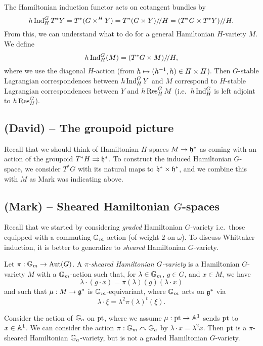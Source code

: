 \documentclass{article}
\begin{document}
The Hamiltonian induction functor acts on cotangent bundles by
\[
	h\Ind_H^G T^*Y = T^*(G \times^H Y) = T^*(G \times Y) \sslash H = (T^*G \times T^*Y) \sslash H.
\]
From this, we can understand what to do for a general Hamiltonian $H$-variety $M$.
We define
\[
	h\Ind_H^G(M) = (T^*G \times M) \sslash H,
\]
where we use the diagonal $H$-action (from $h \mapsto (h\inv, h) \in H \times H$).
Then $G$-stable Lagrangian correspondences between $h\Ind_H^G Y$ and $M$ correspond to $H$-stable Lagrangian correspondences between $Y$ and $h\Res_H^G M$ (i.e.\ $h\Ind_H^G$ is left adjoint to $h\Res_H^G$).

\subsection{(David) -- The groupoid picture}

Recall that we should think of Hamiltonian $H$-spaces $M \to \hf^*$ as coming with an action of the groupoid $T^*H \rightrightarrows \hf^*$.
To construct the induced Hamiltonian $G$-space, we consider $T^*G$ with its natural maps to $\hf^* \times \hf^*$, and we combine this with $M$ as Mark was indicating above.

\subsection{(Mark) -- Sheared Hamiltonian $G$-spaces}

Recall that we started by considering \emph{graded} Hamiltonian $G$-variety i.e.\ those equipped with a commuting $\GG_m$-action (of weight $2$ on $\omega$).
To discuss Whittaker induction, it is better to generalize to \emph{sheared} Hamiltonian $G$-variety.

\begin{dfn}
	Let $\pi: \GG_m \to \Aut(G)$.
	A \emph{$\pi$-sheared Hamiltonian $G$-variety} is a Hamiltonian $G$-variety $M$ with a $\GG_m$-action such that, for $\lambda \in \GG_m$, $g \in G$, and $x \in M$, we have
	\[
		\lambda \cdot (g \cdot x) = \pi(\lambda)(g)(\lambda \cdot x)
	\]
	and such that $\mu: M \to \gf^*$ is $\GG_m$-equivariant, where $\GG_m$ acts on $\gf^*$ via 
	\[
		\lambda \cdot \xi = \lambda^2 \pi(\lambda)^t (\xi).
	\]
\end{dfn}

\begin{ex}
	Consider the action of $\GG_a$ on $\pt$, where we assume $\mu: \pt \to \AA^1$ sends $\pt$ to $x \in \AA^1$.
	We can consider the action $\pi: \GG_m \curvearrowright \GG_a$ by $\lambda \cdot x = \lambda^2 x$.
	Then $\pt$ is a $\pi$-sheared Hamiltonian $\GG_a$-variety, but is not a graded Hamiltonian $G$-variety.
\end{ex}
\end{document}
